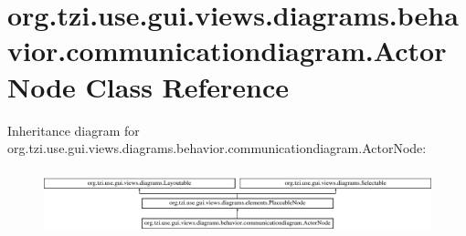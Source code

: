 \hypertarget{classorg_1_1tzi_1_1use_1_1gui_1_1views_1_1diagrams_1_1behavior_1_1communicationdiagram_1_1_actor_node}{\section{org.\-tzi.\-use.\-gui.\-views.\-diagrams.\-behavior.\-communicationdiagram.\-Actor\-Node Class Reference}
\label{classorg_1_1tzi_1_1use_1_1gui_1_1views_1_1diagrams_1_1behavior_1_1communicationdiagram_1_1_actor_node}
}
Inheritance diagram for org.\-tzi.\-use.\-gui.\-views.\-diagrams.\-behavior.\-communicationdiagram.\-Actor\-Node\-:\begin{figure}[H]
\begin{center}
\leavevmode
\includegraphics[height=1.900452cm]{classorg_1_1tzi_1_1use_1_1gui_1_1views_1_1diagrams_1_1behavior_1_1communicationdiagram_1_1_actor_node}
\end{center}
\end{figure}
